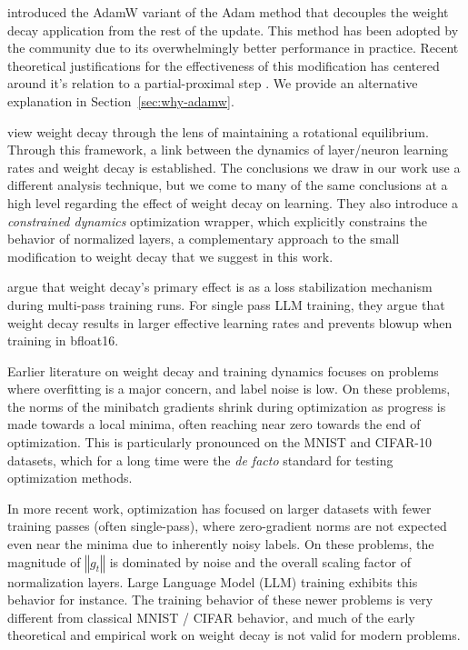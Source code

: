 \documentclass[]{fairmeta}
\begin{document}
\citet{loshchilov2018decoupled} introduced the AdamW variant of the Adam method that decouples the weight decay application from the rest of the update. This method has been adopted by the community due to its overwhelmingly better performance in practice. Recent theoretical justifications for the effectiveness of this modification has centered around it's relation to a partial-proximal step \citep{zhuang2022understanding}. We provide an alternative explanation in Section~\ref{sec:why-adamw}.

\citet{kosson2024rotationalequilibriumweightdecay} view weight decay through the lens of maintaining a rotational equilibrium. Through this framework, a link between the dynamics of layer/neuron learning rates and weight decay is established. The conclusions we draw in our work use a different analysis technique, but we come to many of the same conclusions at a high level regarding the effect of weight decay on learning. They also introduce a \emph{constrained dynamics} optimization wrapper, which explicitly constrains the behavior of normalized layers, a complementary approach to the small modification to weight decay that we suggest in this work.

\citet{dangelo2024needweightdecaymodern} argue that weight decay's primary effect is as a loss stabilization mechanism during multi-pass training runs. For single pass LLM training, they argue that weight decay results in larger effective learning rates and prevents blowup when training in bfloat16. 

Earlier literature on weight decay and training dynamics focuses on problems where overfitting is a major concern, and label noise is low. On these problems, the norms of the minibatch gradients shrink during optimization as progress is made towards a local minima, often reaching near zero towards the end of optimization. This is particularly pronounced on the MNIST and CIFAR-10 datasets, which for a long time were the \emph{de facto} standard for testing optimization methods. 

In more recent work, optimization has focused on larger datasets with fewer training passes (often single-pass), where zero-gradient norms are not expected even near the minima due to inherently noisy labels. On these problems, the magnitude of  $\left\Vert g_{t}\right\Vert$ is dominated by noise and the overall scaling factor of normalization layers. Large Language Model (LLM) training exhibits this behavior for instance. The training behavior of these newer problems is very different from classical MNIST / CIFAR behavior, and much of the early theoretical and empirical work on weight decay is not valid for modern problems.
\end{document}
